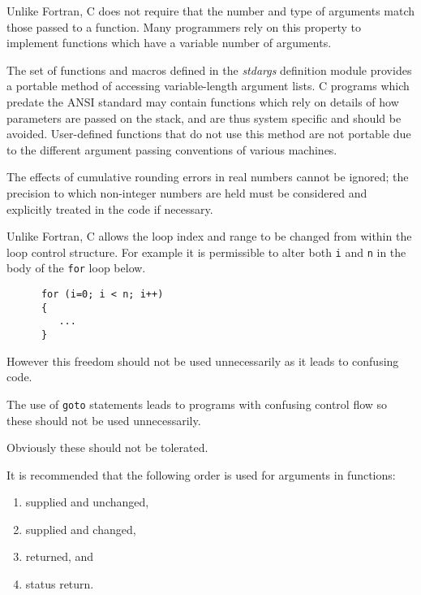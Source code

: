 
Unlike Fortran, C does not require that the number and type of 
arguments match those passed to a function.
Many programmers rely on this property to implement functions 
which have a variable number of arguments.

The set of functions and macros defined in the {\it stdargs\/} definition 
module provides a portable method of accessing variable-length argument
lists.
C programs which predate the ANSI standard may contain functions which rely on 
details of how parameters are passed on the 
stack, and are thus system specific and should be avoided.
User-defined functions that do not use this method are not portable due to the 
different argument passing conventions of various machines.





The effects of cumulative rounding errors in real numbers cannot be ignored; 
the precision to which non-integer numbers are held must be considered and 
explicitly treated in the code if necessary.



Unlike Fortran, C allows the loop index  and range to be changed 
from within the loop control structure.
For example it is permissible to alter both {\tt i} and {\tt n}
in the body of the {\tt for} loop below.
\begin{verbatim}
      for (i=0; i < n; i++)
      {                       
         ...
      }
\end{verbatim}          
However this freedom should not be used unnecessarily as it leads to 
confusing code.


The use of {\tt goto} statements leads to programs with confusing control 
flow so these should not be used unnecessarily.


Obviously these should not be tolerated.


It is recommended that the following order is used for arguments in 
functions:
\begin{enumerate}
\item supplied and unchanged, 
\item supplied and changed, 
\item returned, and 
\item status return.
\end{enumerate}



